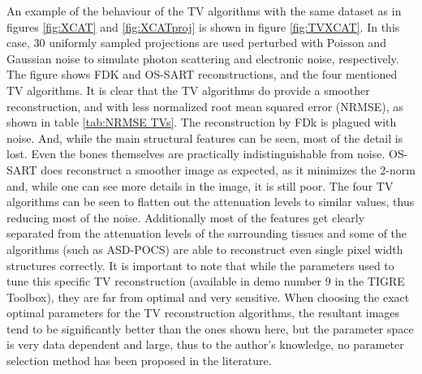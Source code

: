 An example of the behaviour of the TV algorithms with the same dataset as in figures \ref{fig:XCAT} and \ref{fig:XCATproj} is shown in figure \ref{fig:TVXCAT}. In this case, 30 uniformly sampled projections are used perturbed with Poisson and Gaussian noise to simulate photon scattering and electronic noise, respectively. The figure shows FDK and OS-SART reconstructions, and the four mentioned TV algorithms. It is clear that the TV algorithms do provide a smoother reconstruction, and with less normalized root mean squared error (NRMSE), as shown in table \ref{tab:NRMSE TVs}.
The reconstruction by FDk is plagued with noise. And, while the main structural features can be seen, most of the detail is lost. Even the bones themselves are practically indistinguishable from noise. OS-SART does reconstruct a smoother image as expected, as it minimizes the 2-norm and, while one can see more details in the image, it is still poor. The four TV algorithms can be seen to flatten out the attenuation levels to similar values, thus reducing most of the noise. Additionally most of the features get clearly separated from the attenuation levels of the surrounding tissues and some of the algorithms (such as ASD-POCS) are able to reconstruct even single pixel width structures correctly. It is important to note that while the parameters used to tune this specific TV reconstruction (available in demo number 9 in the TIGRE Toolbox), they are far from optimal and very sensitive\cite{Vee}. When choosing the exact optimal parameters for the TV reconstruction algorithms, the resultant images tend to be significantly better than the ones shown here, but the parameter space is very data dependent and large, thus to the author's knowledge, no parameter selection method has been proposed in the literature. 


